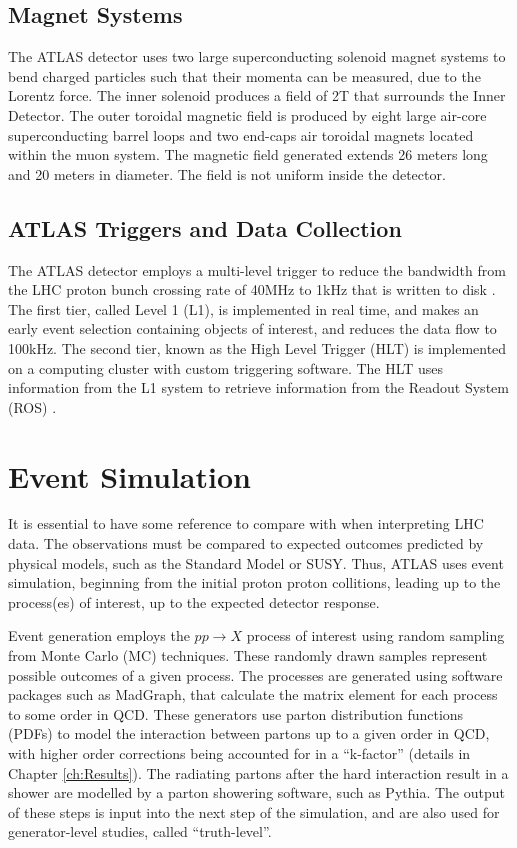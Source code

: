 \documentclass[12pt,a4paper,openright,twoside]{report}
\begin{document}
\subsection{Magnet Systems}
The ATLAS detector uses two large superconducting solenoid magnet systems to bend charged particles such that their momenta can be measured, due to the Lorentz force. The inner solenoid produces a field of 2T that surrounds the Inner Detector. The outer toroidal magnetic field is produced by eight large air-core superconducting barrel loops and two end-caps air toroidal magnets located within the muon system. The magnetic field generated extends 26 meters long and 20 meters in diameter. The field is not uniform inside the detector.

\subsection{ATLAS Triggers and Data Collection}
The ATLAS detector employs a multi-level trigger to reduce the bandwidth from the LHC proton bunch crossing rate of 40MHz to 1kHz that is written to disk \cite{trigger1,trigger2}. The first tier, called Level 1 (L1), is implemented in real time, and makes an early event selection containing objects of interest, and reduces the data flow to 100kHz. The second tier, known as the High Level Trigger (HLT) \cite{HLT} is implemented on a computing cluster with custom triggering software. The HLT uses information from the L1 system to retrieve information from the Readout System (ROS) \cite{ROS}.

\section{Event Simulation}
It is essential to have some reference to compare with when interpreting LHC data. The observations must be compared to expected outcomes predicted by physical models, such as the Standard Model or SUSY. Thus, ATLAS uses event simulation, beginning from the initial proton proton collitions, leading up to the process(es) of interest, up to the expected detector response.

Event generation employs the $pp\to X$ process of interest using random sampling from Monte Carlo (MC) techniques. These randomly drawn samples represent possible outcomes of a given process. The processes are generated using software packages such as MadGraph\cite{MadGraph}, that calculate the matrix element for each process to some order in QCD. These generators use parton distribution functions (PDFs) to model the interaction between partons up to a given order in QCD, with higher order corrections being accounted for in a ``k-factor'' (details in Chapter \ref{ch:Results}). The radiating partons after the hard interaction result in a shower are modelled by a parton showering software, such as Pythia\cite{pythia}. The output of these steps is input into the next step of the simulation, and are also used for generator-level studies, called ``truth-level''.
\end{document}
